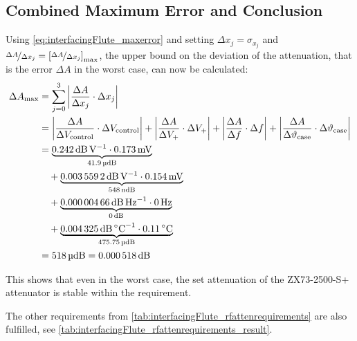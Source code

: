 \subsection{Combined Maximum Error and Conclusion}
Using \autoref{eq:interfacingFlute_maxerror} and setting $\Delta x_j = \sigma_{x_j}$ and $\nicefrac{\Delta A}{\Delta x_j} = \left[\nicefrac{\Delta A}{\Delta x_j}\right]_\text{max}$, the upper bound on the deviation of the attenuation, that is the error $\Delta A$ in the worst case, can now be calculated:
\begin{align}
\Delta A_{\text{max}} &= \sum_{j=0}^{3} \left|\frac{\Delta A}{\Delta x_j} \cdot \Delta x_j\right|\\
                      &= \left|\frac{\Delta A}{\Delta V_\text{control}} \cdot \Delta V_\text{control}\right|
                      +  \left|\frac{\Delta A}{\Delta V_{+}} \cdot \Delta V_{+}\right|
                      +  \left|\frac{\Delta A}{\Delta f} \cdot \Delta f\right|
                      +  \left|\frac{\Delta A}{\Delta \vartheta_\text{case}} \cdot \Delta \vartheta_\text{case}\right|\\
                      &=       \underbrace{\SI{0.242}{\dB\per\volt} \cdot \SI{0.173}{\milli\volt}}_{\SI{41.9}{\micro\dB\relax}}\\
                      &\quad+  \underbrace{\SI{0.0035592}{\dB\per\volt} \cdot \SI{0.154}{\milli\volt}}_{\SI{548}{\nano\dB\relax}}\\
                      &\quad+  \underbrace{\SI{0.00000466}{\dB\per\hertz} \cdot \SI{0}{\hertz}}_{\SI{0}{\dB\relax}}\\
                      &\quad+  \underbrace{\SI{0.004325}{\dB\per\celsius} \cdot \SI{0.11}{\celsius}}_{\SI{475.75}{\micro\dB\relax}}\\
                      &= \SI{518}{\micro\dB\relax} = \SI{0.000518}{\dB}
\end{align}

This shows that even in the worst case, the set attenuation of the ZX73-2500-S+ attenuator is stable within the requirement.

The other requirements from \autoref{tab:interfacingFlute_rfattenrequirements} are also fulfilled, see \autoref{tab:interfacingFlute_rfattenrequirements_result}.

